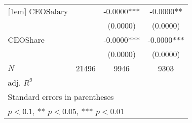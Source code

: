 \begin{table}[htbp]
\begin{tabular}{l*{3}{c}}
[1em]
CEOSalary   &               &     -0.0000***&     -0.0000** \\
            &               &    (0.0000)   &    (0.0000)   \\
[1em]
CEOShare    &               &     -0.0000***&     -0.0000***\\
            &               &    (0.0000)   &    (0.0000)   \\
\hline
\(N\)       &       21496   &        9946   &        9303   \\
adj. \(R^{2}\)&               &               &               \\
\hline\hline
\multicolumn{4}{l}{\footnotesize Standard errors in parentheses}\\
\multicolumn{4}{l}{\footnotesize * \(p<0.1\), ** \(p<0.05\), *** \(p<0.01\)}\\
\end{tabular}
\end{table}

